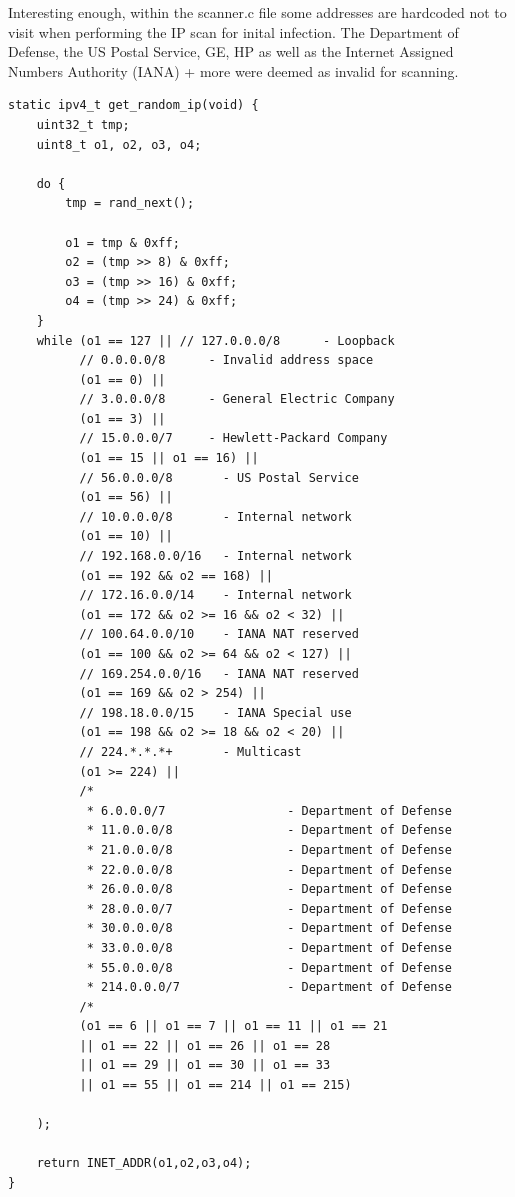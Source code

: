 \documentclass[12pt, letterpaper]{article}
\begin{document}
\begin{sloppypar}
\begin{flushleft}
Interesting enough, within the scanner.c file some addresses are hardcoded not to visit 
when performing the IP scan for inital infection. The Department of Defense, the US Postal
Service, GE, HP as well as the Internet Assigned Numbers Authority (IANA) + more were 
deemed as invalid for scanning.


\begin{lstlisting}
static ipv4_t get_random_ip(void) {
    uint32_t tmp;
    uint8_t o1, o2, o3, o4;

    do {
        tmp = rand_next();

        o1 = tmp & 0xff;
        o2 = (tmp >> 8) & 0xff;
        o3 = (tmp >> 16) & 0xff;
        o4 = (tmp >> 24) & 0xff;
    }
    while (o1 == 127 || // 127.0.0.0/8      - Loopback
          // 0.0.0.0/8		- Invalid address space
          (o1 == 0) || 
          // 3.0.0.0/8		- General Electric Company
          (o1 == 3) || 
          // 15.0.0.0/7		- Hewlett-Packard Company
          (o1 == 15 || o1 == 16) || 
          // 56.0.0.0/8       - US Postal Service
          (o1 == 56) || 
          // 10.0.0.0/8       - Internal network
          (o1 == 10) || 
          // 192.168.0.0/16   - Internal network
          (o1 == 192 && o2 == 168) ||
          // 172.16.0.0/14    - Internal network
          (o1 == 172 && o2 >= 16 && o2 < 32) ||
          // 100.64.0.0/10    - IANA NAT reserved
          (o1 == 100 && o2 >= 64 && o2 < 127) ||
          // 169.254.0.0/16   - IANA NAT reserved
          (o1 == 169 && o2 > 254) ||
          // 198.18.0.0/15    - IANA Special use
          (o1 == 198 && o2 >= 18 && o2 < 20) ||
          // 224.*.*.*+       - Multicast
          (o1 >= 224) ||
		  /*
		   * 6.0.0.0/7                 - Department of Defense 
		   * 11.0.0.0/8                - Department of Defense
		   * 21.0.0.0/8                - Department of Defense
		   * 22.0.0.0/8                - Department of Defense
		   * 26.0.0.0/8                - Department of Defense
		   * 28.0.0.0/7                - Department of Defense
		   * 30.0.0.0/8                - Department of Defense
		   * 33.0.0.0/8                - Department of Defense
		   * 55.0.0.0/8                - Department of Defense
		   * 214.0.0.0/7               - Department of Defense
		  /*          
          (o1 == 6 || o1 == 7 || o1 == 11 || o1 == 21 
          || o1 == 22 || o1 == 26 || o1 == 28 
          || o1 == 29 || o1 == 30 || o1 == 33 
          || o1 == 55 || o1 == 214 || o1 == 215) 
          
    );

    return INET_ADDR(o1,o2,o3,o4);
}


\end{lstlisting}
\end{flushleft}
\end{sloppypar}
\end{document}
